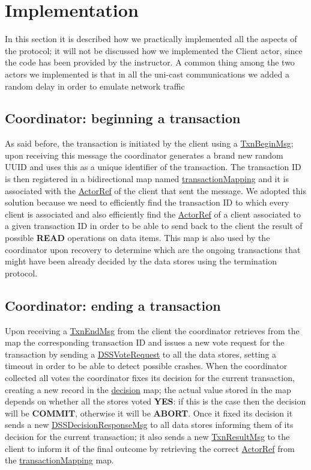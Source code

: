 \section{Implementation}
In this section it is described how we practically implemented all the aspects of the protocol; it will not be discussed how we implemented the Client actor, since the code has been provided by the instructor.
\newline
A common thing among the two actors we implemented is that in all the uni-cast communications we added a random delay in order to emulate network traffic

\subsection{Coordinator: beginning a transaction}
As said before, the transaction is initiated by the client using a \url{TxnBeginMsg}; upon receiving this message the coordinator generates a brand new random UUID and uses this as a unique identifier of the transaction. The transaction ID is then registered in a bidirectional map named \url{transactionMapping} and it is associated with the \url{ActorRef} of the client that sent the message. We adopted this solution because we need to efficiently find the transaction ID to which every client is associated and also efficiently find the \url{ActorRef} of a client associated to a given transaction ID in order to be able to send back to the client the result of possible \textbf{READ} operations on data items.
\newline
This map is also used by the coordinator upon recovery to determine which are the ongoing transactions that might have been already decided by the data stores using the termination protocol.

\subsection{Coordinator: ending a transaction}
Upon receiving a \url{TxnEndMsg} from the client the coordinator retrieves from the map the corresponding transaction ID and issues a new vote request for the transaction by sending a \url{DSSVoteRequest} to all the data stores, setting a timeout in order to be able to detect possible crashes.
\newline
When the coordinator collected all votes the coordinator fixes its decision for the current transaction, creating a new record in the \url{decision} map; the actual value stored in the map depends on whether all the stores voted \textbf{YES}: if this is the case then the decision will be \textbf{COMMIT}, otherwise it will be \textbf{ABORT}.
\newline
Once it fixed its decision it sends a new \url{DSSDecisionResponseMsg} to all data stores informing them of its decision for the current transaction; it also sends a new \url{TxnResultMsg} to the client to inform it of the final outcome by retrieving the correct \url{ActorRef} from the \url{transactionMapping} map.

